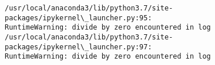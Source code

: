 \documentclass[11pt]{article}
\begin{document}
    \begin{Verbatim}[commandchars=\\\{\}]
/usr/local/anaconda3/lib/python3.7/site-packages/ipykernel\_launcher.py:95:
RuntimeWarning: divide by zero encountered in log
/usr/local/anaconda3/lib/python3.7/site-packages/ipykernel\_launcher.py:97:
RuntimeWarning: divide by zero encountered in log
    \end{Verbatim}

    \begin{center}
    \end{center}
    { \hspace*{\fill} \\}
    
    \begin{center}
    \end{center}
    { \hspace*{\fill} \\}
    

    
    
    
\end{document}
